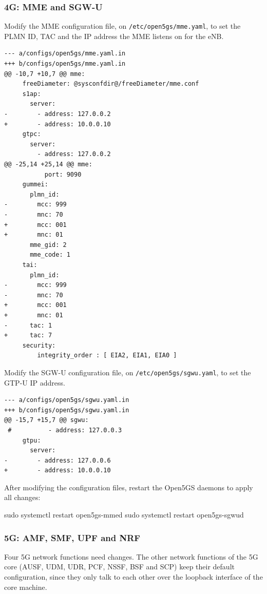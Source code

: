 \subsubsection{4G: MME and SGW-U}
Modify the \gls{MME} configuration file, on \texttt{/etc/open5gs/mme.yaml}, to set the \gls{PLMN} ID, TAC and the IP address the \gls{MME} listens on for the \gls{eNB}.

\begin{verbatim}
--- a/configs/open5gs/mme.yaml.in
+++ b/configs/open5gs/mme.yaml.in
@@ -10,7 +10,7 @@ mme:
     freeDiameter: @sysconfdir@/freeDiameter/mme.conf
     s1ap:
       server:
-        - address: 127.0.0.2
+        - address: 10.0.0.10
     gtpc:
       server:
         - address: 127.0.0.2
@@ -25,14 +25,14 @@ mme:
           port: 9090
     gummei:
       plmn_id:
-        mcc: 999
-        mnc: 70
+        mcc: 001
+        mnc: 01
       mme_gid: 2
       mme_code: 1
     tai:
       plmn_id:
-        mcc: 999
-        mnc: 70
+        mcc: 001
+        mnc: 01
-      tac: 1
+      tac: 7
     security:
         integrity_order : [ EIA2, EIA1, EIA0 ]
\end{verbatim}

Modify the SGW-U configuration file, on \texttt{/etc/open5gs/sgwu.yaml}, to set the \gls{GTP-U} IP address.
\begin{verbatim}
--- a/configs/open5gs/sgwu.yaml.in
+++ b/configs/open5gs/sgwu.yaml.in
@@ -15,7 +15,7 @@ sgwu:
 #          - address: 127.0.0.3
     gtpu:
       server:
-        - address: 127.0.0.6
+        - address: 10.0.0.10
\end{verbatim}
After modifying the configuration files, restart the Open5GS daemons to apply all changes:
\begin{code}
sudo systemctl restart open5gs-mmed
sudo systemctl restart open5gs-sgwud
\end{code}

\subsubsection{5G: AMF, SMF, UPF and NRF}
Four 5G network functions need changes. The other network functions of the 5G core (\gls{AUSF}, \gls{UDM}, \gls{UDR}, \gls{PCF}, \gls{NSSF}, BSF and SCP) keep their default configuration, since they only talk to each other over the loopback interface of the core machine.

